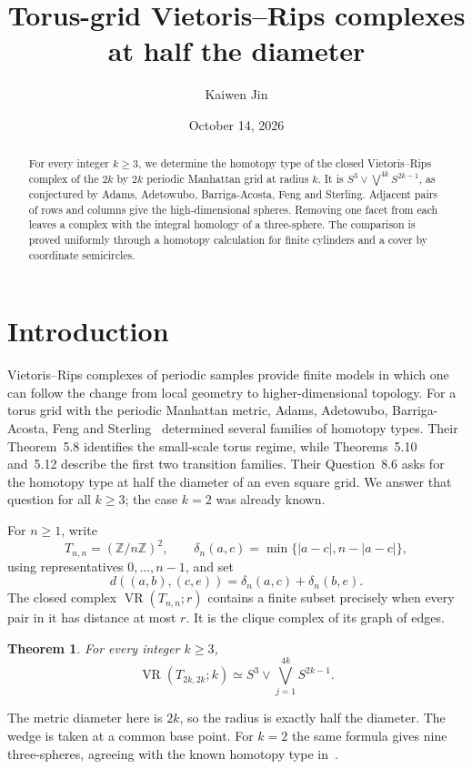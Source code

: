 \documentclass[11pt]{amsart}
\title{Torus-grid Vietoris--Rips complexes at half the diameter}
\author{Kaiwen Jin}
\date{October 14, 2026}
\newtheorem{theorem}{Theorem}
\newcommand{\VR}{\operatorname{VR}}
\newcommand{\ZZ}{\mathbb Z}
\begin{document}
\begin{abstract}
For every integer \(k\geq3\), we determine the homotopy type of the closed
Vietoris--Rips complex of the \(2k\) by \(2k\) periodic Manhattan grid at
radius \(k\). It is
\(S^3\vee\bigvee^{4k}S^{2k-1}\), as conjectured by Adams, Adetowubo,
Barriga-Acosta, Feng and Sterling. Adjacent pairs of rows and columns give
the high-dimensional spheres. Removing one facet from each leaves a
complex with the integral homology of a three-sphere. The comparison is
proved uniformly through a homotopy calculation for finite cylinders
and a cover by coordinate semicircles.
\end{abstract}
\maketitle

\section{Introduction}

Vietoris--Rips complexes of periodic samples provide finite models in which
one can follow the change from local geometry to higher-dimensional
topology. For a torus grid with the periodic Manhattan metric, Adams,
Adetowubo, Barriga-Acosta, Feng and Sterling~\cite{torus} determined several
families of homotopy types. Their Theorem~5.8 identifies the small-scale
torus regime, while Theorems~5.10 and~5.12 describe the first two
transition families. Their Question~8.6 asks for the homotopy type at
half the diameter of an even square grid. We answer that question for all
\(k\geq3\); the case \(k=2\) was already known.

For \(n\geq1\), write
\[
T_{n,n}=(\ZZ/n\ZZ)^2,\qquad
\delta_n(a,c)=\min\{|a-c|,n-|a-c|\},
\]
using representatives \(0,\ldots,n-1\), and set
\[
d((a,b),(c,e))=\delta_n(a,c)+\delta_n(b,e).
\]
The closed complex \(\VR(T_{n,n};r)\) contains a finite subset precisely
when every pair in it has distance at most \(r\). It is the clique complex
of its graph of edges.

\begin{theorem}\label{thm:main}
For every integer \(k\geq3\),
\[
\VR(T_{2k,2k};k)\simeq
S^3\vee\bigvee_{j=1}^{4k}S^{2k-1}.
\]
\end{theorem}

The metric diameter here is \(2k\), so the radius is exactly half the
diameter. The wedge is taken at a common base point. For \(k=2\) the same
formula gives nine three-spheres, agreeing with the known homotopy type
in~\cite{torus}.
\end{document}
